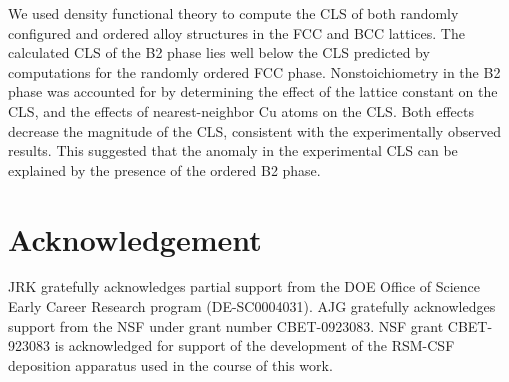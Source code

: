 \documentclass[number, sort&compress, review, 12pt]{elsarticle}
\begin{document}
We used density functional theory to compute the CLS of both randomly configured and ordered alloy structures in the FCC and BCC lattices. The calculated CLS of the B2 phase lies well below the CLS predicted by computations for the randomly ordered FCC phase. Nonstoichiometry in the B2 phase was accounted for by determining the effect of the lattice constant on the CLS, and the effects of nearest-neighbor Cu atoms on the CLS. Both effects decrease the magnitude of the CLS, consistent with the experimentally observed results. This suggested that the anomaly in the experimental CLS can be explained by the presence of the ordered B2 phase.

\section*{Acknowledgement}
JRK gratefully acknowledges partial support from the DOE Office of Science Early Career Research program (DE-SC0004031). AJG gratefully acknowledges support from the NSF under grant number CBET-0923083. NSF grant
CBET-923083 is acknowledged for support of the development of the RSM-CSF
deposition apparatus used in the course of this work.
\end{document}
